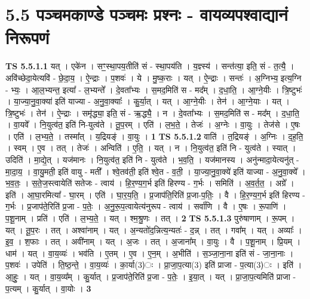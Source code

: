 \documentclass[17pt]{extarticle}
\begin{document}
\section*{ 5.5      पञ्चमकाण्डे पञ्चमः प्रश्नः - वायव्यपश्वाद्यानं निरूपणं }
                                \textbf{ TS 5.5.1.1} \newline
                  यत् । एके॑न । सꣳ॒॒स्था॒पय॒तीति॑ सं - स्था॒पय॑ति । य॒ज्ञ्स्य॑ । सन्त॑त्या॒ इति॒ सं - त॒त्यै॒ । अवि॑च्छेदा॒येत्यवि॑ - छे॒दा॒य॒ । ऐ॒न्द्राः । प॒शवः॑ । ये । मु॒ष्क॒राः । यत् । ऐ॒न्द्राः । सन्तः॑ । अ॒ग्निभ्य॒ इत्य॒ग्नि - भ्यः॒ । आ॒ल॒भ्यन्त॒ इत्या᳚ - ल॒भ्यन्ते᳚ । दे॒वता᳚भ्यः । स॒मद॒मिति॑ स - मद᳚म् । द॒धा॒ति॒ । आ॒ग्ने॒यीः । त्रि॒ष्टुभः॑ । या॒ज्या॒नु॒वा॒क्या॑ इति॑ याज्या - अ॒नु॒वा॒क्याः᳚ । कु॒र्या॒त् । यत् । आ॒ग्ने॒यीः । तेन॑ । आ॒ग्ने॒याः । यत् । त्रि॒ष्टुभः॑ । तेन॑ । ऐ॒न्द्राः । समृ॑द्ध्या॒ इति॒ सं - ऋ॒द्ध्यै॒ । न । दे॒वता᳚भ्यः । स॒मद॒मिति॑ स - मद᳚म् । द॒धा॒ति॒ । वा॒यवे᳚ । नि॒युत्व॑त॒ इति॑ नि-युत्व॑ते । तू॒प॒रम् । एति॑ । ल॒भ॒ते॒ । तेजः॑ । अ॒ग्नेः । वा॒युः । तेज॑से । ए॒षः । एति॑ । ल॒भ्य॒ते॒ । तस्मा᳚त् । य॒द्रियङ्॑ । वा॒युः । \textbf{  1} \newline
                  \newline
                                \textbf{ TS 5.5.1.2} \newline
                  वाति॑ । त॒द्रियङ्॑ । अ॒ग्निः । द॒ह॒ति॒ । स्वम् । ए॒व । तत् । तेजः॑ । अन्विति॑ । ए॒ति॒ । यत् । न । नि॒युत्व॑त॒ इति॑ नि - युत्व॑ते । स्यात् । उदिति॑ । मा॒द्ये॒त् । यज॑मानः । नि॒युत्व॑त॒ इति॑ नि - युत्व॑ते । भ॒व॒ति॒ । यज॑मानस्य । अनु॑न्मादा॒येत्यनु॑त् - मा॒दा॒य॒ । वा॒यु॒मती॒ इति॑ वायु - मती᳚ । श्वे॒तव॑ती॒ इति॑ श्वे॒त - व॒ती॒ । या॒ज्या॒नु॒वा॒क्ये॑ इति॑ याज्या - अ॒नु॒वा॒क्ये᳚ । भ॒व॒तः॒ । स॒ते॒ज॒स्त्वायेति॑ सतेजः - त्वाय॑ । हि॒र॒ण्य॒ग॒र्भ इति॑ हिरण्य - ग॒र्भः । समिति॑ । अ॒व॒र्त॒त॒ । अग्रे᳚ । इति॑ । आ॒घा॒रमित्या᳚ - घा॒रम् । एति॑ । घा॒र॒य॒ति॒ । प्र॒जाप॑ति॒रिति॑ प्र॒जा-प॒तिः॒ । वै । हि॒र॒ण्य॒ग॒र्भ इति॑ हिरण्य - ग॒र्भः । प्र॒जाप॑ते॒रिति॑ प्र॒जा - प॒तेः॒ । अ॒नु॒रू॒प॒त्वायेत्य॑नुरूप - त्वाय॑ । सर्वा॑णि । वै । ए॒षः । रू॒पाणि॑ । प॒शू॒नाम् । प्रति॑ । एति॑ । ल॒भ्य॒ते॒ । यत् । श्म॒श्रु॒णः । तत् । \textbf{  2} \newline
                  \newline
                                \textbf{ TS 5.5.1.3} \newline
                  पुरु॑षाणाम् । रू॒पम् । यत् । तू॒प॒रः । तत् । अश्वा॑नाम् । यत् । अ॒न्यतो॑द॒न्नित्य॒न्यतः॑ - द॒न्न् । तत् । गवा᳚म् । यत् । अव्याः᳚ । इ॒व॒ । श॒फाः । तत् । अवी॑नाम् । यत् । अ॒जः । तत् । अ॒जाना᳚म् । वा॒युः । वै । प॒शू॒नाम् । प्रि॒यम् । धाम॑ । यत् । वा॒य॒व्यः॑ । भव॑ति । ए॒तम् । ए॒व । ए॒न॒म् । अ॒भीति॑ । स॒ञ्जा॒ना॒ना इति॑ सं - जा॒ना॒नाः । प॒शवः॑ । उपेति॑ । ति॒ष्ठ॒न्ते॒ । वा॒य॒व्यः॑ । का॒र्या(3)ः । प्रा॒जा॒प॒त्या(3) इति॑ प्राजा - प॒त्या(3)ः । इति॑ । आ॒हुः॒ । यत् । वा॒य॒व्य᳚म् । कु॒र्यात् । प्र॒जाप॑ते॒रिति॑ प्र॒जा - प॒तेः॒ । इ॒या॒त् । यत् । प्रा॒जा॒प॒त्यमिति॑ प्राजा - प॒त्यम् । कु॒र्यात् । वा॒योः । \textbf{  3} \newline
\end{document}

